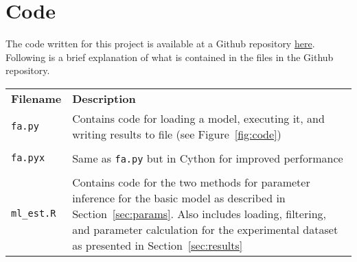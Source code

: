 \chapter{Code} 
The code written for this project is available at a Github repository \href{https://github.com/azardilis/fa_metabolism}{here}.
Following is a brief explanation of what is contained in the files in
the Github repository.

\begin{table}[h]
\centering
\begin{tabular}{lp{8cm}}
\textbf{Filename} & \textbf{Description} \\
\texttt{fa.py}  &  Contains code for loading a model, executing it, and writing results to file (see Figure~\ref{fig:code}) \\[0.05cm]
\\
\texttt{fa.pyx}         &  Same as \texttt{fa.py} but in Cython for improved performance          \\[0.05cm]\\
\texttt{ml\_est.R}         &  Contains code for the two methods for
parameter inference for the basic model as described in Section~\ref{sec:params}. Also includes loading, filtering, and parameter calculation for the experimental dataset as presented in Section~\ref{sec:results}
\end{tabular}
\end{table}




